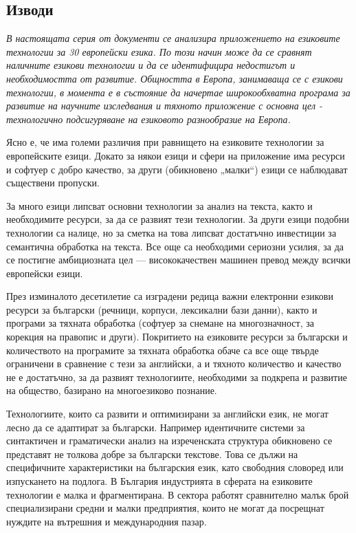 \documentclass[]{../../metanetpaper}
\begin{document}
\begin{multicols}{2}
\subsection{Изводи}

\emph{В настоящата серия от документи се анализира приложението на
  езиковите технологии за 30 европейски езика. По този начин може да
  се сравнят наличните езикови технологии и да се идентифицира
  недостигът и необходимостта от развитие. Общността в Европа,
  занимаваща се с езикови технологии, в момента е в състояние да
  начертае широкообхватна програма за развитие на научните изследвания
  и тяхното приложение с основна цел - технологично подсигуряване на
  езиковото разнообразие на Европа.}

Ясно е, че има големи различия при равнището на езиковите технологии
за европейските езици. Докато за някои езици и сфери на приложение има
ресурси и софтуер с добро качество, за други (обикновено „малки“)
езици се наблюдават съществени пропуски.

За много езици липсват основни технологии за анализ на текста, както и
необходимите ресурси, за да се развият тези технологии. За други езици
подобни технологии са налице, но за сметка на това липсват достатъчно
инвестиции за семантична обработка на текста. Все още са необходими
сериозни усилия, за да се постигне амбициозната цел — висококачествен
машинен превод между всички европейски езици.

През изминалото десетилетие са изградени редица важни електронни
езикови ресурси за български (речници, корпуси, лексикални бази
данни), както и програми за тяхната обработка (софтуер за снемане на
многозначност, за корекция на правопис и други). Покритието на
езиковите ресурси за български и количеството на програмите за тяхната
обработка обаче са все още твърде ограничени в сравнение с тези за
английски, а и тяхното количество и качество не е достатъчно, за да
развият технологиите, необходими за подкрепа и развитие на общество,
базирано на многоезиково познание.

Технологиите, които са развити и оптимизирани за английски език, не
могат лесно да се адаптират за български. Например идентичните системи
за синтактичен и граматически анализ на изреченската структура
обикновено се представят не толкова добре за български текстове. Това
се дължи на специфичните характеристики на българския език, като
свободния словоред или изпускането на подлога.  В България индустрията
в сферата на езиковите технологии е малка и фрагментирана. В сектора
работят сравнително малък брой специализирани средни и малки
предприятия, които не могат да посрещнат нуждите на вътрешния и
международния пазар.


\end{multicols}
\end{document}

